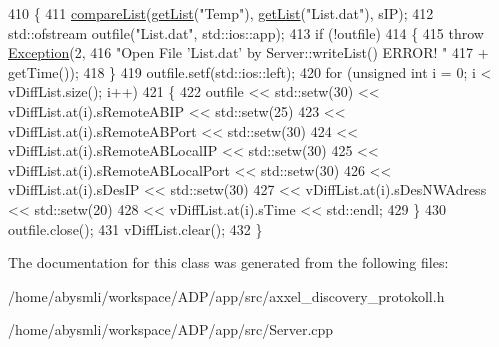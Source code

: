 \begin{DoxyCode}
410 \{
411     \hyperlink{classServer_a10cfd4823ae5286931cbaaf487bd5739}{compareList}(\hyperlink{classServer_a36e2161377e0960cbafa5bef009c57de}{getList}(\textcolor{stringliteral}{"Temp"}), \hyperlink{classServer_a36e2161377e0960cbafa5bef009c57de}{getList}(\textcolor{stringliteral}{"List.dat"}), sIP);
412     std::ofstream outfile(\textcolor{stringliteral}{"List.dat"}, std::ios::app);
413     \textcolor{keywordflow}{if} (!outfile)
414     \{
415         \textcolor{keywordflow}{throw} \hyperlink{classException}{Exception}(2,
416                 \textcolor{stringliteral}{"Open File 'List.dat' by Server::writeList() ERROR! "}
417                         + getTime());
418     \}
419     outfile.setf(std::ios::left);
420     \textcolor{keywordflow}{for} (\textcolor{keywordtype}{unsigned} \textcolor{keywordtype}{int} i = 0; i < vDiffList.size(); i++)
421     \{
422         outfile << std::setw(30) << vDiffList.at(i).sRemoteABIP << std::setw(25)
423                 << vDiffList.at(i).sRemoteABPort << std::setw(30)
424                 << vDiffList.at(i).sRemoteABLocalIP << std::setw(30)
425                 << vDiffList.at(i).sRemoteABLocalPort << std::setw(30)
426                 << vDiffList.at(i).sDesIP << std::setw(30)
427                 << vDiffList.at(i).sDesNWAdress << std::setw(20)
428                 << vDiffList.at(i).sTime << std::endl;
429     \}
430     outfile.close();
431     vDiffList.clear();
432 \}
\end{DoxyCode}


The documentation for this class was generated from the following files\-:\begin{DoxyCompactItemize}
\item 
/home/abysmli/workspace/\-A\-D\-P/app/src/axxel\-\_\-discovery\-\_\-protokoll.\-h\item 
/home/abysmli/workspace/\-A\-D\-P/app/src/Server.\-cpp\end{DoxyCompactItemize}
